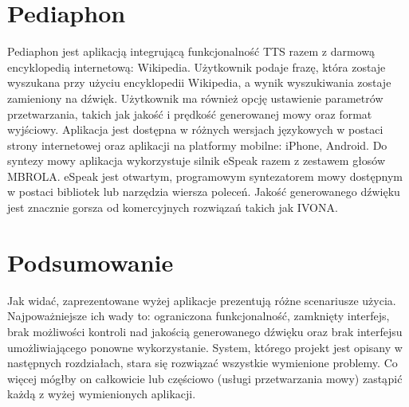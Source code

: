 \section {Pediaphon} 

Pediaphon\cite{pediaphon} jest aplikacją integrującą funkcjonalność TTS razem z darmową encyklopedią internetową: Wikipedia. Użytkownik podaje frazę, która zostaje wyszukana przy użyciu encyklopedii Wikipedia, a wynik wyszukiwania zostaje zamieniony na dźwięk. Użytkownik ma również opcję ustawienie parametrów przetwarzania, takich jak jakość i prędkość generowanej mowy oraz format wyjściowy. Aplikacja jest dostępna w różnych wersjach językowych w postaci strony internetowej oraz aplikacji na platformy mobilne: iPhone, Android. Do syntezy mowy aplikacja wykorzystuje silnik eSpeak razem z zestawem głosów MBROLA. eSpeak jest otwartym, programowym syntezatorem mowy dostępnym w postaci bibliotek lub narzędzia wiersza poleceń. Jakość generowanego dźwięku jest znacznie gorsza od komercyjnych rozwiązań takich jak IVONA.

\section*{Podsumowanie} 
Jak widać, zaprezentowane wyżej aplikacje prezentują różne scenariusze użycia. Najpoważniejsze ich wady to: ograniczona funkcjonalność, zamknięty interfejs, brak możliwości kontroli nad jakością generowanego dźwięku oraz brak interfejsu umożliwiającego ponowne wykorzystanie. System, którego projekt jest opisany w następnych rozdziałach, stara się  rozwiązać wszystkie wymienione problemy. Co więcej mógłby on całkowicie lub częściowo (usługi przetwarzania mowy) zastąpić każdą z wyżej wymienionych aplikacji. 





